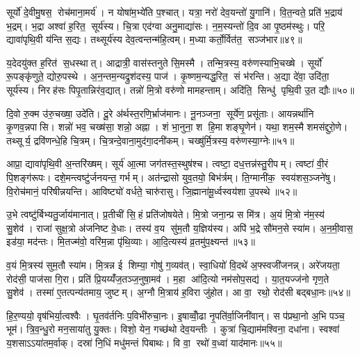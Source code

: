 सूर्यो॑ दे॒वीमु॒षस॒ रोच॑माना॒मर्य॑। न योषा॑म॒भ्ये॑ति प॒श्चात्। यत्रा॒ नरो॑ देव॒यन्तो॑ यु॒गानि॑। वि॒त॒न्वते॒ प्रति॑ भ॒द्राय॑ भ॒द्रम्। भ॒द्रा अश्वा॑ ह॒रित॒ सूर्य॑स्य। चि॒त्रा एद॑ग्वा अनु॒माद्या॑सः। न॒म॒स्यन्तो॑ दि॒व आ पृ॒ष्ठम॑स्थुः। परि॒ द्यावा॑पृथि॒वी य॑न्ति स॒द्यः। तथ्सूर्य॑स्य देव॒त्वन्तन्म॑हि॒त्वम्। म॒ध्या कर्तो॒र्वित॑त॒ सञ्ज॑भार॥४९॥

य॒देदयु॑क्त ह॒रित॑ स॒धस्थात्। आद्रात्री॒ वास॑स्तनुते सि॒मस्मै। तन्मि॒त्रस्य॒ वरु॑णस्याभि॒चख्षे। सूर्यो॑ रू॒पङ्कृ॑णुते॒ द्योरु॒पस्थे। अ॒न॒न्तम॒न्यद्रुश॑दस्य॒ पाज॑। कृ॒ष्णम॒न्यद्ध॒रित॒ सं भ॑रन्ति। अ॒द्या दे॑वा॒ उदि॑ता॒ सूर्य॑स्य। निरह॑सः पिपृ॒तान्निर॑व॒द्यात्। तन्नो॑ मि॒त्रो वरु॑णो मामहन्ताम्। अदि॑ति॒ सिन्धु॑ पृथि॒वी उ॒त द्यौः॥५०॥

दि॒वो रु॒क्म उ॑रु॒चख्षा॒ उदे॑ति। दू॒रे अ॑र्थस्त॒रणि॒र्भ्राज॑मानः। नू॒नञ्जना॒ सूर्ये॑ण॒ प्रसू॑ताः। आयन्नर्था॑नि कृ॒णव॒न्नपासि। शन्नो॑ भव॒ चख्ष॑सा॒ शन्नो॒ अह्ना। शं भा॒नुना॒ श हि॒मा शङ्घृ॒णेन॑। यथा॒ शम॒स्मै शमस॑द्दुरो॒णे। तथ्सूर्य॒ द्रवि॑णन्धे॒हि चि॒त्रम्। चि॒त्रन्दे॒वाना॒मुद॑गा॒दनी॑कम्। चख्षु॑र्मि॒त्रस्य॒ वरु॑णस्या॒ग्नेः॥५१॥

आप्रा॒ द्यावा॑पृथि॒वी अ॒न्तरि॑ख्षम्। सूर्य॑ आ॒त्मा जग॑तस्त॒स्थुष॑श्च। त्वष्टा॒ दध॒त्तन्न॑स्तु॒रीपम्। त्वष्टा॑ वी॒रं पि॒शङ्ग॑रूपः। दशे॒मन्त्वष्टु॑र्जनयन्त॒ गर्भम्। अत॑न्द्रासो युव॒तयो॒ बिभ॑र्त्रम्। ति॒ग्मानी॑क॒ स्वय॑शस॒ञ्जने॑षु। वि॒रोच॑मानं॒ परि॑षीन्नयन्ति। आविष्ट्यो॑ वर्धते॒ चारु॑रासु। जि॒ह्माना॑मू॒र्ध्वस्वय॑शा उ॒पस्थे॥५२॥

उ॒भे त्वष्टु॑र्बिभ्यतु॒र्जाय॑मानात्। प्र॒तीची॑ सि॒हं प्रति॑जोषयेते। मि॒त्रो जना॒न्प्र स मि॑त्र। अ॒यं मि॒त्रो न॑म॒स्य॑ सु॒शेव॑। राजा॑ सुक्ष॒त्रो अ॑जनिष्ट वे॒धाः। तस्य॑ व॒य सु॑म॒तौ य॒ज्ञिय॑स्य। अपि॑ भ॒द्रे सौ॑मन॒से स्या॑म। अ॒न॒मी॒वास॒ इड॑या॒ मद॑न्तः। मि॒तज्म॑वो॒ वरि॑म॒न्ना पृ॑थि॒व्याः। आ॒दि॒त्यस्य॑ व्र॒तमु॑प॒क्ष्यन्त॑॥५३॥

व॒यं मि॒त्रस्य॑ सुम॒तौ स्या॑म। मि॒त्रन्न ई शिम्या॒ गोषु॑ ग॒व्यव॑त्। स्वा॒धियो॑ वि॒दथे॑ अ॒फ्स्वजी॑जनन्न्। अरे॑जयता॒ रोद॑सी॒ पाज॑सा गि॒रा। प्रति॑ प्रि॒यय्यँ॑ज॒तञ्ज॒नुषा॒मव॑। म॒हा आ॑दि॒त्यो नम॑सोप॒सद्य॑। या॒त॒यज्ज॑नो गृण॒ते सु॒शेव॑। तस्मा॑ ए॒तत्पन्य॑तमाय॒ जुष्टम्। अ॒ग्नौ मि॒त्राय॑ ह॒विरा जु॑होत। आ वा॒ रथो॒ रोद॑सी बद्बधा॒नः॥५४॥

हि॒र॒ण्ययो॒ वृष॑भिर्या॒त्वश्वैः। घृ॒तव॑र्तनिः प॒विभी॑रुचा॒नः। इ॒षाव्वोँ॒ढा नृ॒पति॑र्वा॒जिनी॑वान्। स प॑प्रथा॒नो अ॒भि पञ्च॒ भूम॑। त्रि॒व॒न्धु॒रो मन॒साया॑तु यु॒क्तः। विशो॒ येन॒ गच्छ॑थो देव॒यन्तीः। कुत्रा॑ चि॒द्याम॑मश्विना॒ दधा॑ना। स्वश्वा॑ य॒शसाऽऽया॑तम॒र्वाक्। दस्रा॑ नि॒धिं मधु॑मन्तं पिबाथः। वि वा॒ रथो॑ व॒ध्वा॑ याद॑मानः॥५५॥

